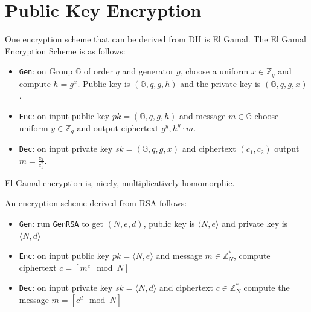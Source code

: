 \section{Public Key Encryption}

One encryption scheme that can be derived from
DH is El Gamal.
The El Gamal Encryption Scheme is as follows:
\begin{itemize}
    \item \texttt{Gen}: on Group $\mathbb{G}$ of order $q$
          and generator $g$, choose a uniform $x \in \mathbb{Z}_q$
          and compute $h = g^x$. Public key is $(\mathbb{G}, q, g, h)$
          and the private key is $(\mathbb{G}, q, g, x)$.
    \item \texttt{Enc}: on input public key $pk = (\mathbb{G}, q, g, h)$
          and message $m \in \mathbb{G}$ choose uniform $y \in \mathbb{Z}_q$
          and output ciphertext $g^y, h^y\cdot m$.
    \item \texttt{Dec}: on input private key $sk = (\mathbb{G}, q, g, x)$
          and ciphertext $(c_1, c_2)$ output $m = \frac{c_2}{c_1^x}$.
\end{itemize}
El Gamal encryption is, nicely, multiplicatively homomorphic.

An encryption scheme derived from RSA follows:
\begin{itemize}
    \item \texttt{Gen}: run \texttt{GenRSA} to get $(N, e, d)$,
          public key is $⟨N, e⟩$ and private key is $⟨N, d⟩$
    \item \texttt{Enc}: on input public key $pk = ⟨N, e⟩$ and message
          $m \in \mathbb{Z}_N^*$, compute ciphertext $c = [m^e \mod N]$
    \item \texttt{Dec}: on input private key $sk = ⟨N, d⟩$ and
          ciphertext $c \in \mathbb{Z}_N^*$ compute the
          message $m = [c^d \mod N ]$
\end{itemize}

